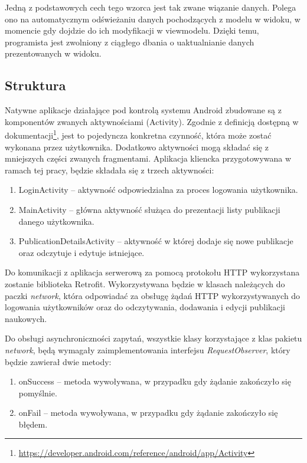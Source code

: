 \documentclass[a4paper,12pt,twoside,openany]{report}
\begin{document}
Jedną z podstawowych cech tego wzorca jest tak zwane wiązanie danych. Polega ono na automatycznym odświeżaniu danych pochodzących z modelu w widoku, w momencie gdy dojdzie do ich modyfikacji w viewmodelu. Dzięki temu, programista jest zwolniony z ciągłego dbania o uaktualnianie danych prezentowanych w widoku.

\newpage
\subsection{Struktura}
Natywne aplikacje działające pod kontrolą systemu Android zbudowane są z komponentów zwanych aktywnościami (Activity). Zgodnie z definicją dostępną w dokumentacji\footnote{\url{https://developer.android.com/reference/android/app/Activity}}, jest to  pojedyncza konkretna czynność, która może zostać wykonana przez użytkownika. Dodatkowo aktywności mogą składać się z mniejszych części zwanych fragmentami. Aplikacja kliencka przygotowywana w ramach tej pracy, będzie składała się z trzech aktywności:
\begin{enumerate}
	\item LoginActivity -- aktywność odpowiedzialna za proces logowania użytkownika.
	
	\item MainActivity -- główna aktywność służąca do prezentacji listy publikacji danego użytkownika. 

	\item PublicationDetailsActivity -- aktywność w której dodaje się nowe publikacje oraz odczytuje i edytuje istniejące.

\end{enumerate}

Do komunikacji z aplikacja serwerową za pomocą protokołu HTTP wykorzystana zostanie biblioteka Retrofit. Wykorzystywana będzie w klasach należących do paczki \textit{network}, która odpowiadać za obsługę żądań HTTP wykorzystywanych do logowania użytkowników oraz do odczytywania, dodawania i edycji publikacji naukowych. 

Do obsługi asynchroniczności zapytań, wszystkie klasy korzystające z klas pakietu \textit{network}, będą wymagały zaimplementowania interfejsu \textit{RequestObserver}, który będzie zawierał dwie metody:
\begin{enumerate}
	\item onSuccess -- metoda wywoływana, w przypadku gdy żądanie zakończyło się pomyślnie.
	
	\item onFail -- metoda wywoływana, w przypadku gdy żądanie zakończyło się błędem.
\end{enumerate}
\end{document}
